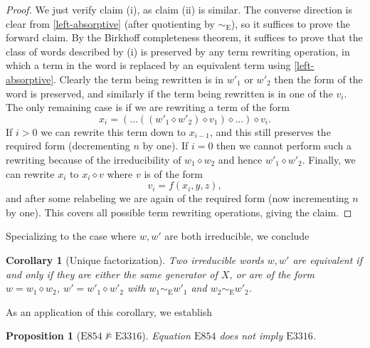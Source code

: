 \documentclass[12pt]{amsart}
\newtheorem{proposition}[theorem]{Proposition}
\newtheorem{corollary}[theorem]{Corollary}
\theoremstyle{definition}
\newcommand{\op}{\diamond}
\newcommand{\nmodels}{\not\models}
\newcommand{\Eq}[1]{\mathrm{E}#1}
\newcommand{\E}{\mathrm{E}}
\begin{document}
\begin{proof}  We just verify claim (i), as claim (ii) is similar.  The converse direction is clear from \eqref{left-absorptive} (after quotienting by $\sim_\E$), so it suffices to prove the forward claim. By the Birkhoff completeness theorem, it suffices to prove that the class of words described by (i) is preserved by any term rewriting operation, in which a term in the word is replaced by an equivalent term using \eqref{left-absorptive}.  Clearly the term being rewritten is in $w'_1$ or $w'_2$ then the form of the word is preserved, and similarly if the term being rewritten is in one of the $v_i$.  The only remaining case is if we are rewriting a term of the form
$$ x_i = ({}\dots((w'_1 \op w'_2) \op v_1) \op \dots{}) \op v_i.$$
If $i>0$ we can rewrite this term down to $x_{i-1}$, and this still preserves the required form (decrementing $n$ by one).  If $i=0$ then we cannot perform such a rewriting because of the irreducibility of $w_1 \op w_2$ and hence $w'_1 \op w'_2$.  Finally, we can rewrite $x_i$ to $x_i \op v$ where $v$ is of the form
$$ v_i = f(x_i,y,z),$$
and after some relabeling we are again of the required form (now incrementing $n$ by one). This covers all possible term rewriting operations, giving the claim.
\end{proof}

Specializing to the case where $w,w'$ are both irreducible, we conclude

\begin{corollary}[Unique factorization]\label{unique-factorization}  Two irreducible words $w, w'$ are equivalent if and only if they are either the same generator of $X$, or are of the form $w = w_1 \op w_2$, $w' = w'_1 \op w'_2$ with $w_1 \sim_\E w'_1$ and $w_2 \sim_\E w'_2$.
\end{corollary}

As an application of this corollary, we establish

\begin{proposition}[$\Eq{854} \nmodels \Eq{3316}$]\label{854-3316} Equation $\Eq{854}$ does not imply $\Eq{3316}$.
\end{proposition}
\end{document}
